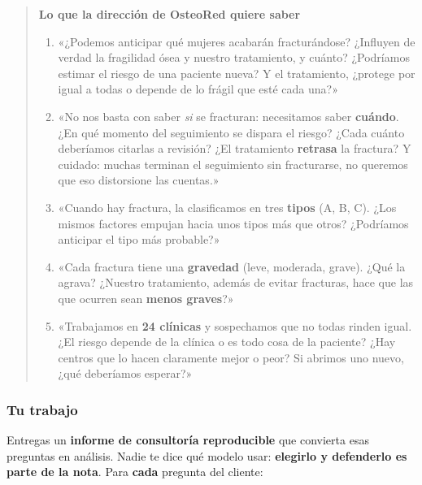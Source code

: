 \documentclass[
  letterpaper,
  DIV=11,
  numbers=noendperiod]{scrartcl}
\providecommand{\tightlist}{%
  \setlength{\itemsep}{0pt}\setlength{\parskip}{0pt}}\usepackage{longtable,booktabs,array}
\begin{document}
\begin{quote}
\textbf{Lo que la dirección de OsteoRed quiere saber}

\begin{enumerate}
\def\labelenumi{\arabic{enumi}.}
\tightlist
\item
  «¿Podemos anticipar qué mujeres acabarán fracturándose? ¿Influyen de
  verdad la fragilidad ósea y nuestro tratamiento, y cuánto? ¿Podríamos
  estimar el riesgo de una paciente nueva? Y el tratamiento, ¿protege
  por igual a todas o depende de lo frágil que esté cada una?»
\item
  «No nos basta con saber \emph{si} se fracturan: necesitamos saber
  \textbf{cuándo}. ¿En qué momento del seguimiento se dispara el riesgo?
  ¿Cada cuánto deberíamos citarlas a revisión? ¿El tratamiento
  \textbf{retrasa} la fractura? Y cuidado: muchas terminan el
  seguimiento sin fracturarse, no queremos que eso distorsione las
  cuentas.»
\item
  «Cuando hay fractura, la clasificamos en tres \textbf{tipos} (A, B,
  C). ¿Los mismos factores empujan hacia unos tipos más que otros?
  ¿Podríamos anticipar el tipo más probable?»
\item
  «Cada fractura tiene una \textbf{gravedad} (leve, moderada, grave).
  ¿Qué la agrava? ¿Nuestro tratamiento, además de evitar fracturas, hace
  que las que ocurren sean \textbf{menos graves}?»
\item
  «Trabajamos en \textbf{24 clínicas} y sospechamos que no todas rinden
  igual. ¿El riesgo depende de la clínica o es todo cosa de la paciente?
  ¿Hay centros que lo hacen claramente mejor o peor? Si abrimos uno
  nuevo, ¿qué deberíamos esperar?»
\end{enumerate}
\end{quote}

\hypertarget{tu-trabajo}{%
\subsubsection{Tu trabajo}\label{tu-trabajo}}

Entregas un \textbf{informe de consultoría reproducible} que convierta
esas preguntas en análisis. Nadie te dice qué modelo usar:
\textbf{elegirlo y defenderlo es parte de la nota}. Para \textbf{cada}
pregunta del cliente:
\end{document}
